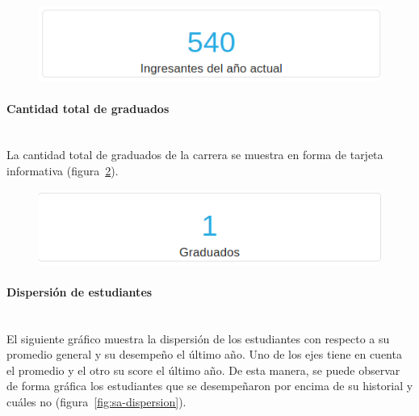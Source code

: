 \begin{figure}[H]
  \centering
    \includegraphics[scale=0.4]{images/seguimiento-academico/sa-ingresantes.png}
  \label{fig:sa-ingresantes}
\end{figure}

\paragraph{Cantidad total de graduados} \mbox{}\\
La cantidad total de graduados de la carrera se muestra en forma de tarjeta informativa (figura~\ref{fig:sa-graduados}).

\begin{figure}[H]
  \centering
    \includegraphics[scale=0.4]{images/seguimiento-academico/sa-graduados.png}
  \label{fig:sa-graduados}
\end{figure}

\paragraph{Dispersión de estudiantes} \mbox{}\\
El siguiente gráfico muestra la dispersión de los estudiantes con respecto a su promedio general y su desempeño el último año. Uno de los ejes tiene en cuenta el promedio y el otro su score el último año. De esta manera, se puede observar de forma gráfica los estudiantes que se desempeñaron por encima de su historial y cuáles no (figura~\ref{fig:sa-dispersion}).

